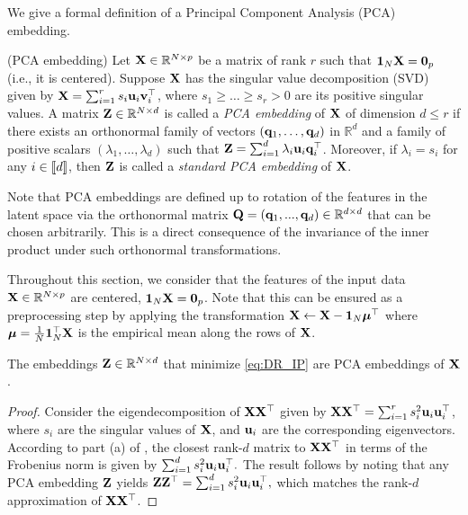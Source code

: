 We give a formal definition of a Principal Component Analysis (PCA) embedding.

\begin{definition}{(PCA embedding)}\label{def:PCA_embedding}
	Let ${\mathbf{X}} \in \mathbb{R}^{N \times p}$ be a matrix of rank $r$ such that $\mathbf{1}_N {\mathbf{X}} = \mathbf{0}_p$ (i.e., it is centered). Suppose ${\mathbf{X}}$ has the singular value decomposition (SVD) given by ${\mathbf{X}} = \sum_{i=1}^{r} s_i {\mathbf{u}}_i {\mathbf{v}}_i^\top$, where $s_1 \geq \dots \geq s_r > 0$ are its positive singular values. A matrix ${\mathbf{Z}} \in \mathbb{R}^{N \times d}$ is called a \emph{PCA embedding} of ${\mathbf{X}}$ of dimension $d \leq r$ if there exists an orthonormal family of vectors $({\mathbf{q}}_1, \dots, {\mathbf{q}}_d)$ in $\mathbb{R}^d$ and a family of positive scalars $(\lambda_1, \dots, \lambda_d)$ such that ${\mathbf{Z}} = \sum_{i=1}^{d} \lambda_i {\mathbf{u}}_i {\mathbf{q}}_i^\top$. Moreover, if $\lambda_i = s_i$ for any $i \in {[\![d]\!]}$, then ${\mathbf{Z}}$ is called a \emph{standard PCA embedding} of ${\mathbf{X}}$.
\end{definition}
	
\begin{remark}
	Note that PCA embeddings are defined up to rotation of the features in the latent space via the orthonormal matrix ${\mathbf{Q}} = ({\mathbf{q}}_1, ..., {\mathbf{q}}_d) \in \mathbb{R}^{d \times d}$ that can be chosen arbitrarily. This is a direct consequence of the invariance of the inner product under such orthonormal transformations.
\end{remark}

Throughout this section, we consider that the features of the input data ${\mathbf{X}} \in \mathbb{R}^{N \times p}$ are centered, \ie $\bm{1}_N {\mathbf{X}} = \bm{0}_p$. Note that this can be ensured as a preprocessing step by applying the transformation ${\mathbf{X}} \leftarrow {\mathbf{X}} - \bm{1}_N \bm{\mu}^\top$ where $\bm{\mu} = \frac{1}{N} \bm{1}_N^\top {\mathbf{X}}$ is the empirical mean along the rows of ${\mathbf{X}}$.

\begin{proposition}\label{prop:PCA_embedding}
    The embeddings ${\mathbf{Z}} \in \mathbb{R}^{N \times d}$ that minimize \ref{eq:DR_IP} are PCA embeddings of ${\mathbf{X}}$.
\end{proposition}

\begin{proof}
    Consider the eigendecomposition of ${\mathbf{X}} {\mathbf{X}}^\top$ given by ${\mathbf{X}} {\mathbf{X}}^\top = \sum_{i=1}^{r} s_i^2 {\mathbf{u}}_i {\mathbf{u}}_i^\top$, where $s_i$ are the singular values of ${\mathbf{X}}$, and ${\mathbf{u}}_i$ are the corresponding eigenvectors. According to part (a) of , the closest rank-$d$ matrix to ${\mathbf{X}} {\mathbf{X}}^\top$ in terms of the Frobenius norm is given by
    $
    \sum_{i=1}^{d} s_i^2 {\mathbf{u}}_i {\mathbf{u}}_i^\top.
    $
    The result follows by noting that any PCA embedding ${\mathbf{Z}}$ yields 
    $
    {\mathbf{Z}} {\mathbf{Z}}^\top = \sum_{i=1}^{d} s_i^2 {\mathbf{u}}_i {\mathbf{u}}_i^\top,
    $
    which matches the rank-$d$ approximation of ${\mathbf{X}} {\mathbf{X}}^\top$.
\end{proof}



